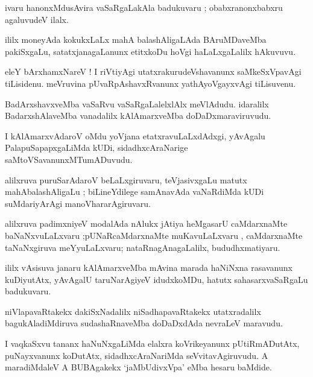 \documentclass{article}
\begin{document}
\begin{mn}
ivaru hanonxMdusAvira vaSaRgaLakAla badukuvaru ; obabxranonxbabxru agaluvudeV ilalx.
\end{mn}

\begin{mn}
ililx moneyAda kokukxLaLx mahA balashAligaLAda BAruMDaveMba pakiSxgaLu, 
satatxjanagaLanunx etitxkoDu hoVgi haLaLxgaLalilx hAkuvuvu.
\end{mn}

\begin{mn}
eleY bArxhamxNareV ! I riVtiyAgi utatxrakurudeVshavanunx saMkeSxVpavAgi tiLisidenu. 
meVruvina pUvaRpAshavxRvanunx yathAyoVgayxvAgi tiLisuvenu.
\end{mn}

\begin{mn}
BadArxshavxveMba vaSaRvu vaSaRgaLalelxlAlx meVlAdudu.
idaralilx BadarxshAlaveMba vanadalilx kAlAmarxveMba doDaDxmaraviruvudu.
\end{mn}

\begin{mn}
I kAlAmarxvAdaroV oMdu yoVjana etatxravuLaLxdAdxgi, yAvAgalu PalapuSapapxgaLiMda kUDi,
sidadhxcAraNarige saMtoVSavanunxMTumADuvudu.
\end{mn}

\begin{mn}
alilxruva puruSarAdaroV beLaLxgiruvaru, teVjasivxgaLu matutx mahAbalashAligaLu ; 
biLineYdilege samAnavAda vaNaRdiMda kUDi suMdariyArAgi manoVhararAgiruvaru.
\end{mn}

\begin{mn}
alilxruva padimxniyeV modalAda nAlukx jAtiya heMgasarU caMdarxnaMte 
baNaNxvuLaLxvaru ;pUNaRcaMdarxnaMte muKavuLaLxvaru , 
caMdarxnaMte taNaNxgiruva meYyuLaLxvaru; 
nataRnagAnagaLalilx, bududhxmatiyaru.
\end{mn}

\begin{mn}
ililx vAsisuva janaru kAlAmarxveMba mAvina marada haNiNxna rasavanunx kuDiyutAtx, 
yAvAgalU taruNarAgiyeV idudxkoMDu, hatutx sahasarxvaSaRgaLu badukuvaru.
\end{mn}

\begin{mn}
niVlapavaRtakekx dakiSxNadalilx niSadhapavaRtakekx utatxradalilx 
bagukAladiMdiruva sudashaRnaveMba doDaDxdAda nevraLeV maravudu.
\end{mn}

\begin{mn}
I vaqkaSxvu tananx haNuNxgaLiMda elalxra koVrikeyanunx pUtiRmADutAtx, 
puNayxvanunx koDutAtx, sidadhxcAraNariMda seVvitavAgiruvudu. 
A maradiMdaleV A BUBAgakekx `jaMbUdivxVpa' eMba hesaru baMdide.
\end{mn}
\end{document}
